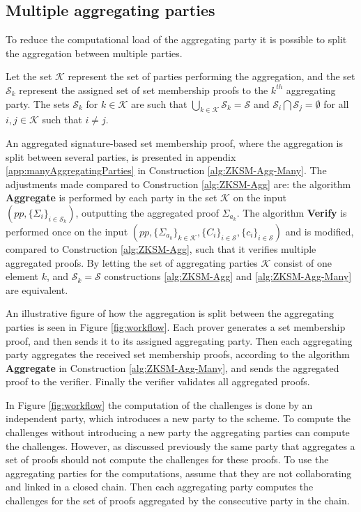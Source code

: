  
\subsection*{Multiple aggregating parties}
To reduce the computational load of the aggregating party it is possible to split the aggregation between multiple parties. %

Let the set $\mathcal{K}$ represent the set of parties performing the aggregation, and the set $\mathcal{S}_k$ represent the assigned set of set membership proofs to the $k^{th}$ aggregating party. The sets $\mathcal{S}_k$ for $k\in\mathcal{K}$ are such that $\bigcup_{k\in\mathcal{K}}\mathcal{S}_k = \mathcal{S}$ and $\mathcal{S}_i\bigcap \mathcal{S}_j= \emptyset$ for all $i,j\in\mathcal{K}$ such that $i\neq j$. 

An aggregated signature-based set membership proof, where the aggregation is split between several parties, is presented in appendix \ref{app:manyAggregatingParties} in Construction \ref{alg:ZKSM-Agg-Many}. The adjustments made compared to Construction \ref{alg:ZKSM-Agg} are: the algorithm \textbf{Aggregate} is performed by each party in the set $\mathcal{K}$ on the input $(pp,\{\Sigma_i\}_{i\in\mathcal{S}_k})$, outputting the aggregated proof $\Sigma_{a_k}$. The algorithm \textbf{Verify} is performed once on the input $(pp,\{\Sigma_{a_k}\}_{k\in\mathcal{K}},\{C_i\}_{i\in\mathcal{S}},\{c_i\}_{i\in\mathcal{S}} )$ and  is modified, compared to Construction \ref{alg:ZKSM-Agg}, such that it verifies multiple aggregated proofs. By letting the set of aggregating parties $\mathcal{K}$ consist of one element $k$, and $\mathcal{S}_k  = \mathcal{S}$ constructions \ref{alg:ZKSM-Agg} and \ref{alg:ZKSM-Agg-Many} are equivalent. 


An illustrative figure of how the aggregation is split between the aggregating parties is seen in Figure \ref{fig:workflow}. Each prover generates a set membership proof, and then sends it to its assigned aggregating party. Then each aggregating party aggregates the received set membership proofs, according to the algorithm \textbf{Aggregate} in Construction \ref{alg:ZKSM-Agg-Many}, and sends the aggregated proof to the verifier. Finally the verifier validates all aggregated proofs.

In Figure \ref{fig:workflow} the computation of the challenges is done by an independent party, which introduces a new party to the scheme. To compute the challenges without introducing a new party the aggregating parties can compute the challenges.  However, as discussed previously the same party that aggregates a set of proofs should not compute the challenges for these proofs. To use the aggregating parties for the computations, assume that they are not collaborating and linked in a closed chain. Then each aggregating party computes the challenges for the set of proofs aggregated by the consecutive party in the chain.  


